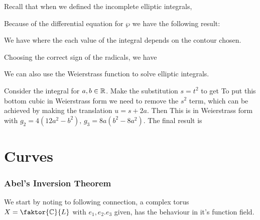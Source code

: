 \documentclass{article}
\begin{document}
Recall that when we defined the incomplete elliptic integrals,

Because of the differential equation for $\wp$ we have the following result:

\begin{prop}
We have 
where the each value of the integral depends on the contour chosen. 
\end{prop}

\begin{example}
	Choosing the correct sign of the radicals, we have 
\end{example}

We can also use the Weierstrass function to solve elliptic integrals.

\begin{example}
	Consider the integral 
for $a,b \in \mathbb{R}$. Make the substitution $s=t^2$ to get 
To put this bottom cubic in Weierstrass form we need to remove the $s^2$ term, which can be achieved by making the translation $u = s+2a$. Then 
This is in Weierstrass form with $g_2 = 4(12a^2-b^2), \, g_3 = 8a(b^2-8a^2)$. The final result is 

\end{example}

\part{Curves}

\section{Abel's Inversion Theorem}

We start by noting to following connection, a complex torus $X = \faktor{\mbb{C}}{L}$ with $e_1, e_2. e_3$ given, has the behaviour 
in it's function field. 
	


\end{document}
